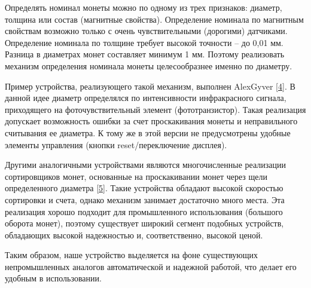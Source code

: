 Определять номинал монеты можно по одному из трех признаков: диаметр, толщина или состав (магнитные свойства). Определение номинала по магнитным свойствам возможно только с очень чувствительными (дорогими) датчиками. Определение номинала по толщине требует высокой точности -- до 0,01 мм. Разница в диаметрах монет составляет минимум 1 мм. Поэтому реализовать механизм определения номинала монеты целесообразнее именно по диаметру.
\par\medskip

Пример устройства, реализующего такой механизм, выполнен AlexGyver [\href{https://www.youtube.com/watch?v=lH4qfGlK2Qk}{4}]. В данной идее диаметр определялся по интенсивности инфракрасного сигнала, приходящего на фоточувствительный элемент (фототранзистор).  Такая реализация допускает возможность ошибки за счет проскакивания монеты и неправильного считывания ее диаметра. К тому же в этой версии не предусмотрены удобные элементы управления (кнопки reset/переключение дисплея).
\par\medskip

Другими аналогичными устройствами являются многочисленные реализации сортировщиков монет, основанные на проскакивании монет через щели определенного диаметра [\href{https://www.youtube.com/watch?v=u0fAAhLuL24&ab_channel=KryzerChannel}{5}]. Такие устройства обладают высокой скоростью сортировки и счета, однако механизм занимает достаточно много места. Эта реализация хорошо подходит для промышленного использования (большого оборота монет), поэтому существует широкий сегмент подобных устройств, обладающих высокой надежностью и, соответственно, высокой ценой. 
\par\medskip

Таким образом, наше устройство выделяется на фоне существующих непромышленных аналогов автоматической и надежной работой, что делает его удобным в использовании.

